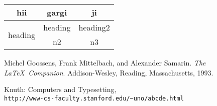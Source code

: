 \documentclass{article}
\begin{document}
\begin{table}
    \centering
    \begin{tabular}{|c|c|c|}
        \hline
        hii                      & gargi   & ji       \\
        \hline
        \multirow{2}{*}{heading} & heading & heading2 \\
        \cline{2-3}              & n2      & n3       \\
        \hline
    \end{tabular}
\end{table}

\begin{thebibliography}{10}
    Michel Goossens, Frank Mittelbach, and Alexander Samarin. 
    \textit{The \LaTeX\ Companion}. 
    Addison-Wesley, Reading, Massachusetts, 1993.
    
    Knuth: Computers and Typesetting,
    \\\texttt{http://www-cs-faculty.stanford.edu/\~{}uno/abcde.html}

\end{thebibliography}
\end{document}
